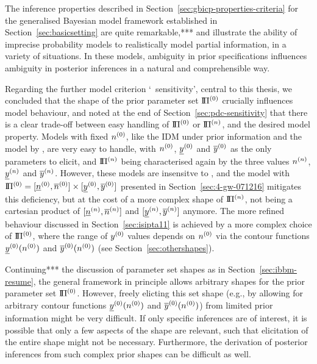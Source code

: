 The inference properties described in Section~\ref{sec:gbicp-properties-criteria}
for the generalised Bayesian model framework established in Section~\ref{sec:basicsetting}
are quite remarkable,***
and illustrate the ability of imprecise probability models to realistically model partial information,
in a variety of situations.
In these models, ambiguity in prior specifications influences ambiguity in posterior inferences
in a natural and comprehensible way.

Regarding the further model criterion `\pdc\ sensitivity',
central to this thesis,
we concluded that the shape of the prior parameter set $\text{I}\!\Pi^{(0)}$
crucially influences model behaviour, 
and noted at the end of Section~\ref{sec:pdc-sensitivity} that
there is a clear trade-off between easy handling of $\text{I}\!\Pi^{(0)}$ or $\text{I}\!\Pi^{(n)}$, and the desired model property.
Models with fixed $n^{(0)}$, like the IDM under prior information and the model by \textcite{2005:quaeghebeurcooman},
are very easy to handle, with $n^{(0)}$, $\underline{y}^{(0)}$ and $\overline{y}^{(0)}$ as the only parameters to elicit,
and $\text{I}\!\Pi^{(n)}$ being characterised again by the three values $n^{(n)}$, $\underline{y}^{(n)}$ and $\overline{y}^{(n)}$.
However, these models are insensitve to \pdc,
and the model with $\text{I}\!\Pi^{(0)} = [\underline{n}^{(0)}, \overline{n}^{(0)}] \times [\underline{y}^{(0)}, \overline{y}^{(0)}]$
presented in Section~\ref{sec:4-gw-071216}
mitigates this deficiency, but at the cost of a more complex shape of $\text{I}\!\Pi^{(n)}$,
not being a cartesian product of $[\underline{n}^{(n)}, \overline{n}^{(n)}]$ and $[\underline{y}^{(n)}, \overline{y}^{(n)}]$ anymore.
The more refined behaviour discussed in Section~\ref{sec:isipta11}
is achieved by a more complex choice of $\text{I}\!\Pi^{(0)}$,
where the range of $y^{(0)}$ values depends on $n^{(0)}$
via the contour functions $\underline{y}^{(0)}(n^{(0)})$ and $\overline{y}^{(0)}(n^{(0)})$
(see Section~\ref{sec:othershapes}).

Continuing*** the discussion of parameter set shapes as in Section~\ref{sec:ibbm-resume},
the general framework in principle allows arbitrary shapes for the prior parameter set $\text{I}\!\Pi^{(0)}$.
However, freely elicting this set shape
(e.g., by allowing for arbitrary contour functions $\underline{y}^{(0)}(n^{(0)})$ and $\overline{y}^{(0)}(n^{(0)})$)
from limited prior information might be very difficult.
If only specific inferences are of interest,
it is possible that only a few aspects of the shape are relevant,
such that elicitation of the entire shape might not be necessary.
Furthermore, the derivation of posterior inferences from
such complex prior shapes can be difficult as well.

